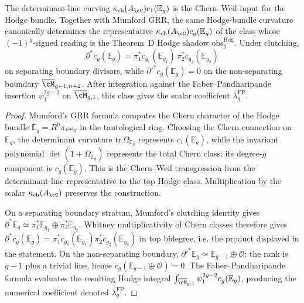 \begin{lemma}
\label{lem:mumford-curving-top-hodge-descent}
The determinant-line curving
$\kappa_{\mathrm{ch}}(A_\cC)c_1(\mathbb{E}_g)$ is the Chern--Weil input
for the Hodge bundle. Together with Mumford GRR, the same Hodge-bundle
curvature canonically determines the representative
$\kappa_{\mathrm{ch}}(A_\cC)c_g(\mathbb{E}_g)$ of the class whose
$(-1)^g$-signed reading is the Theorem~D Hodge shadow
$\mathrm{obs}^{\mathrm{Hdg}}_g$. Under clutching,
\[
\partial^*c_g(\mathbb{E}_g)
=
\pi_1^*c_{g_1}(\mathbb{E}_{g_1})\,
\pi_2^*c_{g_2}(\mathbb{E}_{g_2})
\]
on separating boundary divisors, while
$\partial'^*c_g(\mathbb{E}_g)=0$ on the non-separating boundary
$\overline{\cM}_{g-1,n+2}$.
After integration against the Faber--Pandharipande insertion
$\psi_1^{2g-2}$ on $\overline{\cM}_{g,1}$, this class gives the scalar
coefficient $\lambda_g^{\mathrm{FP}}$.
\end{lemma}

\begin{proof}
Mumford's GRR formula computes the Chern character of the Hodge bundle
$\mathbb{E}_g=R^0\pi_*\omega_\pi$ in the tautological ring. Choosing the
Chern connection on $\mathbb{E}_g$, the determinant curvature
$\mathrm{tr}\,\Omega_{\mathbb{E}_g}$ represents
$c_1(\mathbb{E}_g)$, while the invariant polynomial
$\det(1+\Omega_{\mathbb{E}_g})$ represents the total Chern class; its
degree-$g$ component is $c_g(\mathbb{E}_g)$. This is the Chern--Weil
transgression from the determinant-line representative to the top
Hodge class. Multiplication by the scalar
$\kappa_{\mathrm{ch}}(A_\cC)$ preserves the construction.

On a separating boundary stratum, Mumford's clutching identity gives
$\partial^*\mathbb{E}_g\simeq
\pi_1^*\mathbb{E}_{g_1}\oplus\pi_2^*\mathbb{E}_{g_2}$. Whitney
multiplicativity of Chern classes therefore gives
$\partial^*c_g(\mathbb{E}_g)=
\pi_1^*c_{g_1}(\mathbb{E}_{g_1})
\pi_2^*c_{g_2}(\mathbb{E}_{g_2})$ in top bidegree, i.e. the product
displayed in the statement. On the non-separating boundary,
$\partial'^*\mathbb{E}_g\simeq\mathbb{E}_{g-1}\oplus\mathcal{O}$; the
rank is $g-1$ plus a trivial line, hence
$c_g(\mathbb{E}_{g-1}\oplus\mathcal{O})=0$. The
Faber--Pandharipande formula evaluates the resulting Hodge integral
$\int_{\overline{\cM}_{g,1}}\psi_1^{2g-2}c_g(\mathbb{E}_g)$, producing
the numerical coefficient denoted $\lambda_g^{\mathrm{FP}}$.
\end{proof}

